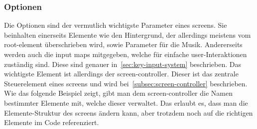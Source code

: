 \subsubsection{Optionen}\label{subsubsec:optionen}
\renewcommand{\kapitelautor}{Autor: Felix Zwickelstorfer}
Die Optionen sind der vermutlich wichtigste Parameter eines screens. 
Sie beinhalten einerseits Elemente wie den Hintergrund, der allerdings meistens vom root-element überschrieben wird, sowie Parameter für die Musik.
Andererseits werden auch die input maps mitgegeben, welche für einfache user-Interaktionen zuständig sind. 
Diese sind genauer in~\ref{sec:key-input-system} beschrieben. 
Das wichtigste Element ist allerdings der screen-controller. 
Dieser ist das zentrale Steuerelement eines screens und wird bei~\ref{subsec:screen-controller} beschrieben. 
Wie das folgende Beispiel zeigt, gibt man dem screen-controller die Namen bestimmter Elemente mit, welche dieser verwaltet. 
Das erlaubt es, dass man die Elemente-Struktur des screens ändern kann, aber trotzdem noch auf die richtigen Elemente im Code referenziert.

